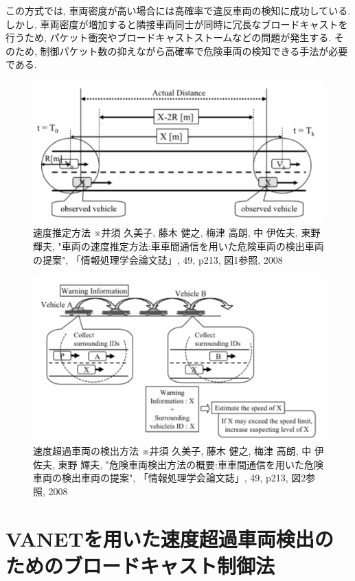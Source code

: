 \documentclass[10pt]{jreport}
\begin{document}
この方式では, 車両密度が高い場合には高確率で違反車両の検知に成功している. しかし, 車両密度が増加すると隣接車両同士が同時に冗長なブロードキャストを行うため, パケット衝突やブロードキャストストーム\cite{sample11}などの問題が発生する. そのため, 制御パケット数の抑えながら高確率で危険車両の検知できる手法が必要である. 

\begin{figure}[H]
\centering
\includegraphics[width=12cm]{figures/2_4_1.png}
\caption{速度推定方法 ※井須 久美子, 藤木 健之, 梅津 高朗, 中 伊佐夫, 東野 輝夫, "車両の速度推定方法:車車間通信を用いた危険車両の検出車両の提案", 「情報処理学会論文誌」, 49, p213, 図1参照, 2008}
\label{fig:speed}
\end{figure}

\begin{figure}[H]
\centering
\includegraphics[width=12cm]{figures/2_4_2.png}
\caption{速度超過車両の検出方法 ※井須 久美子, 藤木 健之, 梅津 高朗, 中 伊佐夫, 東野 輝夫, "危険車両検出方法の概要:車車間通信を用いた危険車両の検出車両の提案", 「情報処理学会論文誌」, 49, p213, 図2参照, 2008}
\label{fig:detect}
\end{figure}


\chapter{VANETを用いた速度超過車両検出のためのブロードキャスト制御法}
\vspace{-5mm}
\end{document}
